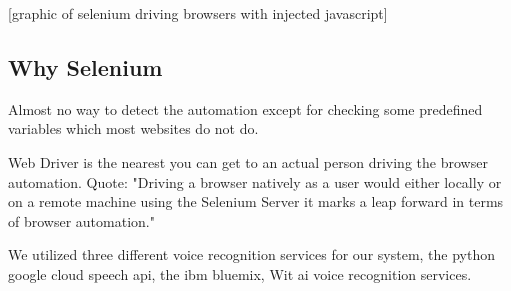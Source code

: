 [graphic of selenium driving browsers with injected javascript]


\subsection{Why Selenium}


Almost no way to detect the automation except for checking some predefined variables which most websites do not do.


Web Driver is the nearest you can get to an actual person driving the browser automation. Quote:  "Driving a browser natively as a user would either locally or on a remote machine using the Selenium Server it marks a leap forward in terms of browser automation."




We utilized three different voice recognition services for our system, the python google cloud speech api, the ibm bluemix, Wit ai voice recognition services.